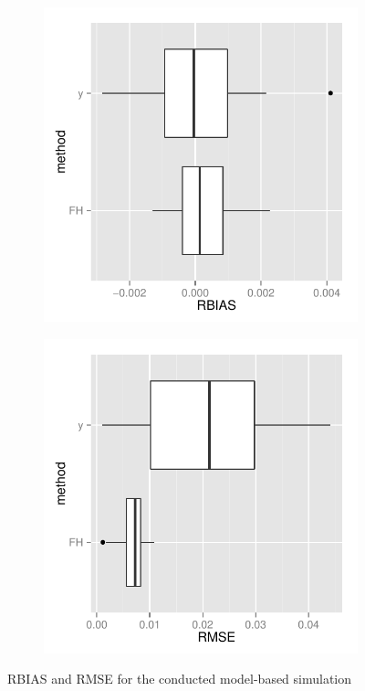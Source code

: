 \documentclass[article]{ajs}
\begin{document}
\begin{figure}[h!]
\begin{subfigure}{.5\textwidth}
\centering
\includegraphics[width=.9\linewidth]{saeSim-modelSimBIAS.pdf}
\caption{}
\end{subfigure}
\begin{subfigure}{.5\textwidth}
\centering
\includegraphics[width=.9\linewidth]{saeSim-modelSimRMSE.pdf}
\caption{}
\end{subfigure}
\caption{RBIAS and RMSE for the conducted model-based simulation}
\end{figure}
\end{document}
